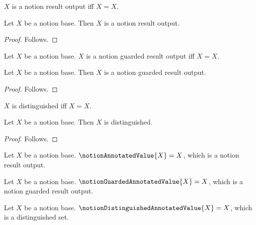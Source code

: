 

\begin{definition}\label{notion_definition_result_output}
    $X$ is a notion result output iff $X=X$.
\end{definition}

\begin{classification}\label{notion_base_is_result_output}
    Let $X$ be a notion base.
    Then $X$ is a notion result output.
\end{classification}
\begin{proof}
    Follows.
\end{proof}

\begin{definition}\label{notion_guarded_result_output}
    Let $X$ be a notion base.
    $X$ is a notion guarded result output iff $X=X$.
\end{definition}

\begin{classification}\label{notion_base_is_guarded_result_output}
    Let $X$ be a notion base.
    Then $X$ is a notion guarded result output.
\end{classification}
\begin{proof}
    Follows.
\end{proof}

\begin{definition}\label{notion_distinguished_result}
    $X$ is distinguished iff $X=X$.
\end{definition}

\begin{classification}\label{notion_base_is_distinguished}
    Let $X$ be a notion base.
    Then $X$ is distinguished.
\end{classification}
\begin{proof}
    Follows.
\end{proof}

\begin{definition}\label{notion_annotated_value}
    Let $X$ be a notion base.
    $\notionAnnotatedValue{X}=X$, which is a notion result output.
\end{definition}

\begin{definition}\label{notion_guarded_annotated_value}
    Let $X$ be a notion base.
    $\notionGuardedAnnotatedValue{X}=X$, which is a notion guarded result output.
\end{definition}

\begin{definition}\label{notion_distinguished_annotated_value}
    Let $X$ be a notion base.
    $\notionDistinguishedAnnotatedValue{X}=X$, which is a distinguished set.
\end{definition}

